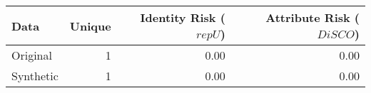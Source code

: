 \begin{tabular}{lrrr}
  \toprule
Data & Unique & Identity Risk ($repU$) & Attribute Risk ($DiSCO$) \\ 
  \midrule
Original &   1 & 0.00 & 0.00 \\ 
  Synthetic &   1 & 0.00 & 0.00 \\ 
   \bottomrule
\end{tabular}
